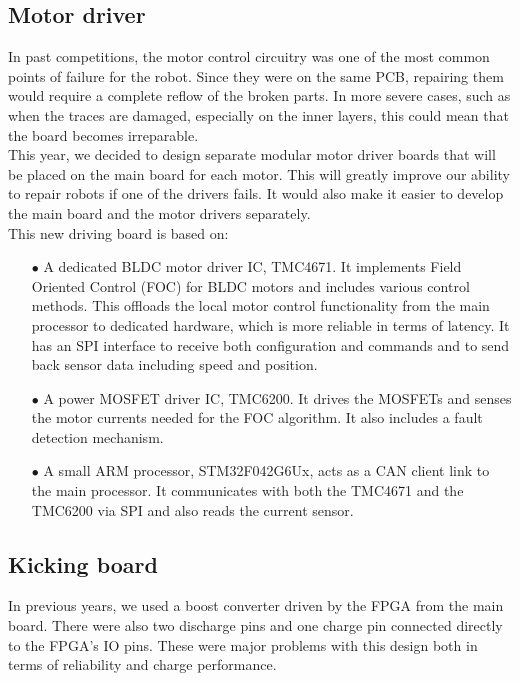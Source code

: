 \documentclass[runningheads]{llncs}
\begin{document}
\subsection{Motor driver}
In past competitions, the motor control circuitry was one of the most common points of failure for the robot. Since they were on the same PCB, repairing them would require a complete reflow of the broken parts. In more severe cases, such as when the traces are damaged, especially on the inner layers, this could mean that the board becomes irreparable.\\
This year, we decided to design separate modular motor driver boards that will be placed on the main board for each motor. This will greatly improve our ability to repair robots if one of the drivers fails. It would also make it easier to develop the main board and the motor drivers separately.\\
This new driving board is based on:
\begin{enumerate}
    \item[$\bullet$] A dedicated BLDC motor driver IC, TMC4671. It implements Field Oriented Control (FOC) for BLDC motors and includes various control methods. This offloads the local motor control functionality from the main processor to dedicated hardware, which is more reliable in terms of latency. It has an SPI interface to receive both configuration and commands and to send back sensor data including speed and position.
    \item[$\bullet$] A power MOSFET driver IC, TMC6200. It drives the MOSFETs and senses the motor currents needed for the FOC algorithm. It also includes a fault detection mechanism.
    \item[$\bullet$] A small ARM processor, STM32F042G6Ux, acts as a CAN client link to the main processor. It communicates with both the TMC4671 and the TMC6200 via SPI and also reads the current sensor.
\end{enumerate}

\subsection{Kicking board}
In previous years, we used a boost converter driven by the FPGA from the main board. There were also two discharge pins and one charge pin connected directly to the FPGA's IO pins. These were major problems with this design both in terms of reliability and charge performance.\\
\end{document}
